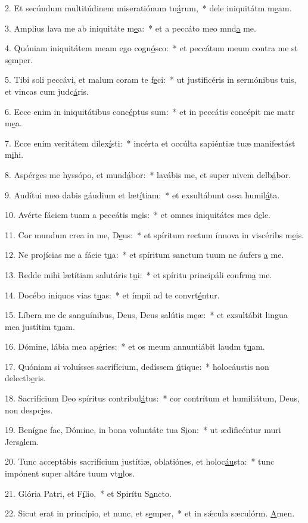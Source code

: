 2. Et secúndum multitúdinem miseratiónum tu\uline{á}rum,~* dele iniquitátm m\uline{e}am.\par 
3. Amplius lava me ab iniquitáte m\uline{e}a:~* et a peccáto meo mnd\uline{a} me.\par 
4. Quóniam iniquitátem meam ego cogn\uline{ó}sco:~* et peccátum meum contra me st s\uline{e}mper.\par 
5. Tibi soli peccávi, et malum coram te f\uline{e}ci:~* ut justificéris in sermónibus tuis, et vincas cum judc\uline{á}ris.\par 
6. Ecce enim in iniquitátibus conc\uline{é}ptus sum:~* et in peccátis concépit me matr m\uline{e}a.\par 
7. Ecce enim veritátem dilex\uline{í}sti:~* incérta et occúlta sapiéntiæ tuæ manifestást m\uline{i}hi.\par 
8. Aspérges me hyssópo, et mund\uline{á}bor:~* lavábis me, et super nivem delb\uline{á}bor.\par 
9. Audítui meo dabis gáudium et læt\uline{í}tiam:~* et exsultábunt ossa humil\uline{á}ta.\par 
10. Avérte fáciem tuam a peccátis m\uline{e}is:~* et omnes iniquitátes mes d\uline{e}le.\par 
11. Cor mundum crea in me, D\uline{e}us:~* et spíritum rectum ínnova in viscéribs m\uline{e}is.\par 
12. Ne projícias me a fácie t\uline{u}a:~* et spíritum sanctum tuum ne áufers \uline{a} me.\par 
13. Redde mihi lætítiam salutáris t\uline{u}i:~* et spíritu principáli confrm\uline{a} me.\par 
14. Docébo iníquos vias t\uline{u}as:~* et ímpii ad te convrt\uline{é}ntur.\par 
15. Líbera me de sanguínibus, Deus, Deus salútis m\uline{e}æ:~* et exsultábit lingua mea justítim t\uline{u}am.\par 
16. Dómine, lábia mea ap\uline{é}ries:~* et os meum annuntiábit laudm t\uline{u}am.\par 
17. Quóniam si voluísses sacrifícium, dedíssem \uline{ú}tique:~* holocáustis non delectb\uline{e}ris.\par 
18. Sacrifícium Deo spíritus contribul\uline{á}tus:~* cor contrítum et humiliátum, Deus, non despc\uline{i}es.\par 
19. Benígne fac, Dómine, in bona voluntáte tua S\uline{i}on:~* ut ædificéntur muri Jers\uline{a}lem.\par 
20. Tunc acceptábis sacrifícium justítiæ, oblatiónes, et holoc\uline{áu}sta:~* tunc impónent super altáre tuum vt\uline{u}los.\par 
21. Glória Patri, et F\uline{í}lio,~* et Spirítu S\uline{a}ncto.\par 
22. Sicut erat in princípio, et nunc, et s\uline{e}mper,~* et in sǽcula sæculórm. \uline{A}men.\par 
